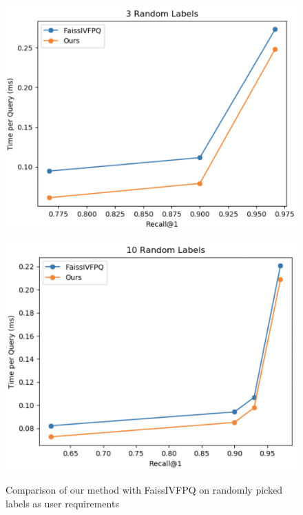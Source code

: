 \begin{figure}
    \centering
    \begin{minipage}[b]{.5\textwidth}
        \centering
        \includegraphics[width=.9\linewidth]{thesis/images/3_random.png}
        \label{fig:randomexpsub1}
    \end{minipage}%
    \begin{minipage}[b]{.5\textwidth}
        \centering
        \includegraphics[width=.9\linewidth]{thesis/images/10_random_only_mo1.png}
        \label{fig:randomexpsub2}
    \end{minipage}
    \caption{Comparison of our method with FaissIVFPQ on randomly picked labels as user requirements}
    \label{fig:randomexp}
\end{figure}

